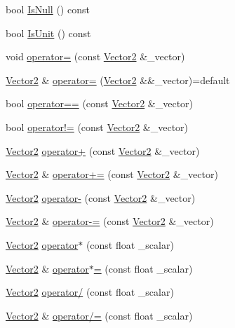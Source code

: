 \begin{DoxyCompactItemize}
bool \mbox{\hyperlink{structpad_1_1math_1_1_vector2_a5aeeb38488eb3d220506c64d557e94ae}{Is\+Null}} () const
\item 
bool \mbox{\hyperlink{structpad_1_1math_1_1_vector2_ac89422aa3df0d31115df268982e9bb0e}{Is\+Unit}} () const
\item 
void \mbox{\hyperlink{structpad_1_1math_1_1_vector2_aa51f745cce489dd9eac9291a1a9bc5c2}{operator=}} (const \mbox{\hyperlink{structpad_1_1math_1_1_vector2}{Vector2}} \&\+\_\+vector)
\item 
\mbox{\hyperlink{structpad_1_1math_1_1_vector2}{Vector2}} \& \mbox{\hyperlink{structpad_1_1math_1_1_vector2_a33461284df3fb3b552f58aa3546da484}{operator=}} (\mbox{\hyperlink{structpad_1_1math_1_1_vector2}{Vector2}} \&\&\+\_\+vector)=default
\item 
bool \mbox{\hyperlink{structpad_1_1math_1_1_vector2_a972117e74465bc6e610d646943922975}{operator==}} (const \mbox{\hyperlink{structpad_1_1math_1_1_vector2}{Vector2}} \&\+\_\+vector)
\item 
bool \mbox{\hyperlink{structpad_1_1math_1_1_vector2_a3fc28d0cce711c660bf2b462aeaf41f2}{operator!=}} (const \mbox{\hyperlink{structpad_1_1math_1_1_vector2}{Vector2}} \&\+\_\+vector)
\item 
\mbox{\hyperlink{structpad_1_1math_1_1_vector2}{Vector2}} \mbox{\hyperlink{structpad_1_1math_1_1_vector2_af15cdb7c3cc3862a45ea35b5d6f934be}{operator+}} (const \mbox{\hyperlink{structpad_1_1math_1_1_vector2}{Vector2}} \&\+\_\+vector)
\item 
\mbox{\hyperlink{structpad_1_1math_1_1_vector2}{Vector2}} \& \mbox{\hyperlink{structpad_1_1math_1_1_vector2_a5c5fa87e2a0f8b5d2e3223220dea22a4}{operator+=}} (const \mbox{\hyperlink{structpad_1_1math_1_1_vector2}{Vector2}} \&\+\_\+vector)
\item 
\mbox{\hyperlink{structpad_1_1math_1_1_vector2}{Vector2}} \mbox{\hyperlink{structpad_1_1math_1_1_vector2_a0d028e47bd7f8b2c26fc52c49bc2f973}{operator-\/}} (const \mbox{\hyperlink{structpad_1_1math_1_1_vector2}{Vector2}} \&\+\_\+vector)
\item 
\mbox{\hyperlink{structpad_1_1math_1_1_vector2}{Vector2}} \& \mbox{\hyperlink{structpad_1_1math_1_1_vector2_a03d8723e7dc2ecb94b1b7e65ecb59ebb}{operator-\/=}} (const \mbox{\hyperlink{structpad_1_1math_1_1_vector2}{Vector2}} \&\+\_\+vector)
\item 
\mbox{\hyperlink{structpad_1_1math_1_1_vector2}{Vector2}} \mbox{\hyperlink{structpad_1_1math_1_1_vector2_af6fa8a12be3dbf3cf27500df9eb93496}{operator$\ast$}} (const float \+\_\+scalar)
\item 
\mbox{\hyperlink{structpad_1_1math_1_1_vector2}{Vector2}} \& \mbox{\hyperlink{structpad_1_1math_1_1_vector2_a2560ceda08780dc1543b3367eda784e4}{operator$\ast$=}} (const float \+\_\+scalar)
\item 
\mbox{\hyperlink{structpad_1_1math_1_1_vector2}{Vector2}} \mbox{\hyperlink{structpad_1_1math_1_1_vector2_adc54031c4f4593cda1860f3fd0b3f1dc}{operator/}} (const float \+\_\+scalar)
\item 
\mbox{\hyperlink{structpad_1_1math_1_1_vector2}{Vector2}} \& \mbox{\hyperlink{structpad_1_1math_1_1_vector2_a7fa51370af7bcda161bc803d13e52789}{operator/=}} (const float \+\_\+scalar)
\end{DoxyCompactItemize}
